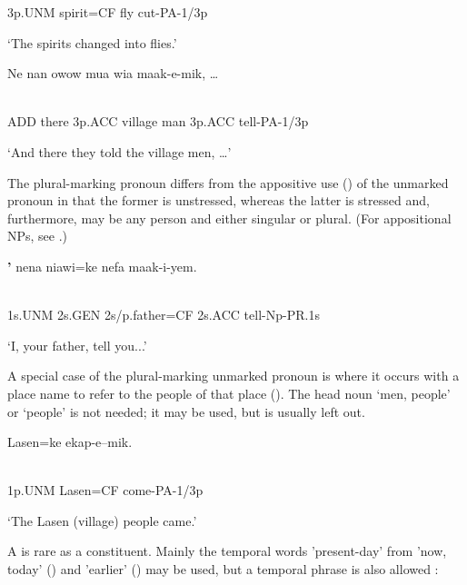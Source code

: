 3p.UNM  spirit=CF  fly  cut-PA-1/3p

`The spirits changed into flies.'

\ea%
\label{ex:x1831}
\gll Ne  nan    owow  mua  wia  maak-e-mik,  {\dots} \\
      \\
\glt
\z

ADD  there  3p.ACC  village  man  3p.ACC  tell-PA-1/3p

`And there they told the village men, {\dots}'

The plural-marking pronoun differs from the appositive use () of the unmarked pronoun in that the former is unstressed, whereas the latter is stressed and, furthermore, may be any person and either singular or plural. (For appositional NPs, see .)

\ea%
\label{ex:x399}
\gll \textbf{'}  nena  niawi=ke  nefa  maak-i-yem. \\
      \\
\glt
\z

1s.UNM  2s.GEN  2s/p.father=CF  2s.ACC  tell-Np-PR.1s

`I, your father, tell you...'

A special case of the plural-marking unmarked pronoun is where it occurs with a place name to refer to the people of that place ().  The head noun  `men, people' or   `people' is not needed; it may be used, but is usually left out.

\ea%
\label{ex:x400}
\gll {}  Lasen=ke  ekap-e--mik. \\
      \\
\glt
\z

1p.UNM  Lasen=CF  come-PA-1/3p

`The Lasen (village) people came.'

A  is rare as a  constituent. Mainly the temporal words   'present-day' from  'now, today' () and  'earlier' () may be used, but a temporal phrase is also allowed : 

